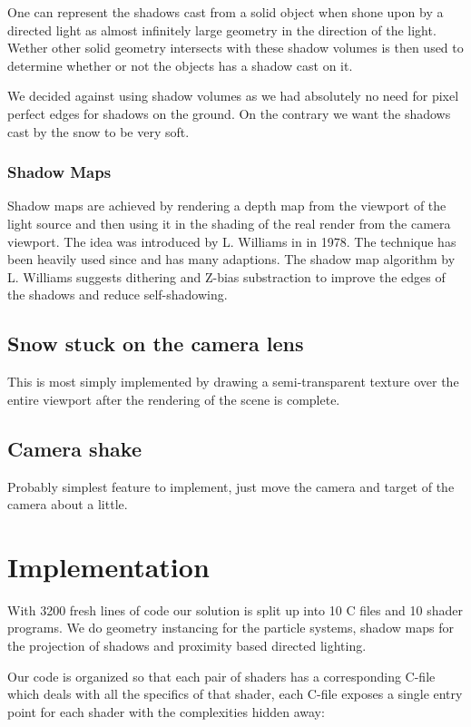 \documentclass[a4paper,12pt]{article}
\begin{document}
One can represent the shadows cast from a solid object when shone upon by a directed light as almost infinitely large geometry in the direction of the light. Wether other solid geometry intersects with these shadow volumes is then used to determine whether or not the objects has a shadow cast on it.

We decided against using shadow volumes as we had absolutely no need for pixel perfect edges for shadows on the ground. On the contrary we want the shadows cast by the snow to be very soft.


\subsubsection{Shadow Maps}

Shadow maps are achieved by rendering a depth map from the viewport of the light source and then using it in the shading of the real render from the camera viewport. The idea was introduced by L. Williams in \cite{shadow-maps} in 1978. The technique has been heavily used since and has many adaptions. The shadow map algorithm by L. Williams suggests dithering and Z-bias substraction to improve the edges of the shadows and reduce self-shadowing.

\subsection{Snow stuck on the camera lens}

This is most simply implemented by drawing a semi-transparent texture over the entire viewport after the rendering of the scene is complete.

\subsection{Camera shake}

Probably simplest feature to implement, just move the camera and target of the camera about a little.

\section{Implementation}

With 3200 fresh lines of code our solution is split up into 10 C files and 10 shader programs. We do geometry instancing for the particle systems, shadow maps for the projection of shadows and proximity based directed lighting.

Our code is organized so that each pair of shaders has a corresponding C-file which deals with all the specifics of that shader, each C-file exposes a single entry point for each shader with the complexities hidden away:
\end{document}
